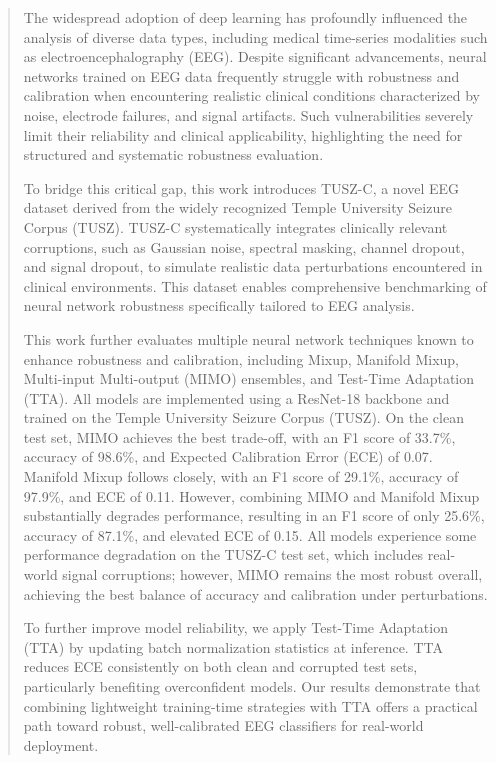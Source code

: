 \begin{abstract}
The widespread adoption of deep learning has profoundly influenced the analysis of diverse data types, including medical time-series modalities such as electroencephalography (EEG). Despite significant advancements, neural networks trained on EEG data frequently struggle with robustness and calibration when encountering realistic clinical conditions characterized by noise, electrode failures, and signal artifacts. Such vulnerabilities severely limit their reliability and clinical applicability, highlighting the need for structured and systematic robustness evaluation.

To bridge this critical gap, this work introduces TUSZ-C, a novel EEG dataset derived from the widely recognized Temple University Seizure Corpus (TUSZ). TUSZ-C systematically integrates clinically relevant corruptions, such as Gaussian noise, spectral masking, channel dropout, and signal dropout, to simulate realistic data perturbations encountered in clinical environments. This dataset enables comprehensive benchmarking of neural network robustness specifically tailored to EEG analysis.

This work further evaluates multiple neural network techniques known to enhance robustness and calibration, including Mixup, Manifold Mixup, Multi-input Multi-output (MIMO) ensembles, and Test-Time Adaptation (TTA).  All models are implemented using a ResNet-18 backbone and trained on the Temple University Seizure Corpus (TUSZ). On the clean test set, MIMO achieves the best trade-off, with an F1 score of 33.7\%, accuracy of 98.6\%, and Expected Calibration Error (ECE) of 0.07. Manifold Mixup follows closely, with an F1 score of 29.1\%, accuracy of 97.9\%, and ECE of 0.11. However, combining MIMO and Manifold Mixup substantially degrades performance, resulting in an F1 score of only 25.6\%, accuracy of 87.1\%, and elevated ECE of 0.15. All models experience some performance degradation on the TUSZ-C test set, which includes real-world signal corruptions; however, MIMO remains the most robust overall, achieving the best balance of accuracy and calibration under perturbations.

To further improve model reliability, we apply Test-Time Adaptation (TTA) by updating batch normalization statistics at inference. TTA reduces ECE consistently on both clean and corrupted test sets, particularly benefiting overconfident models. Our results demonstrate that combining lightweight training-time strategies with TTA offers a practical path toward robust, well-calibrated EEG classifiers for real-world deployment.
\end{abstract}